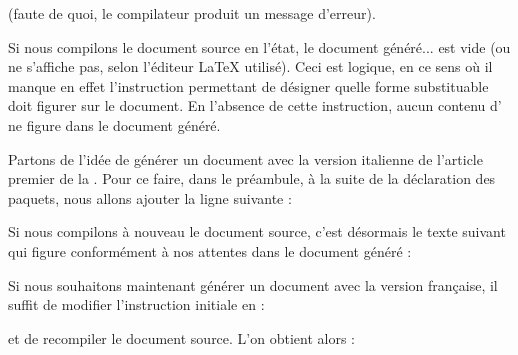 \documentclass{article}
\newcommand\Latex{\LaTeX\xspace} %
\begin{document}
\begin{codeblock}
\end{codeblock}

\resumepar (faute de quoi, le compilateur produit un message d'erreur).

\tutostep
Si nous compilons le document source en l'état, le document généré... est vide (ou ne s'affiche pas, selon l'éditeur \Latex utilisé). Ceci est logique, en ce sens où il manque en effet l'instruction permettant de désigner quelle forme substituable doit figurer sur le document. En l'absence de cette instruction, aucun contenu d' ne figure dans le document généré.

Partons de l'idée de générer un document avec la version italienne de l'article premier de la . Pour ce faire, dans le préambule, à la suite de la déclaration des paquets, nous allons ajouter la ligne suivante :

\begin{codeblock}
\end{codeblock}

Si nous compilons à nouveau le document source, c'est désormais le texte suivant qui figure conformément à nos attentes dans le document généré :

\begin{ltext}
\end{ltext}

Si nous souhaitons maintenant générer un document avec la version française, il suffit de modifier l'instruction initiale en :

\begin{codeblock}
\end{codeblock}

\resumepar et de recompiler le document source. L'on obtient alors :

\begin{ltext}
\end{ltext}
\end{document}
